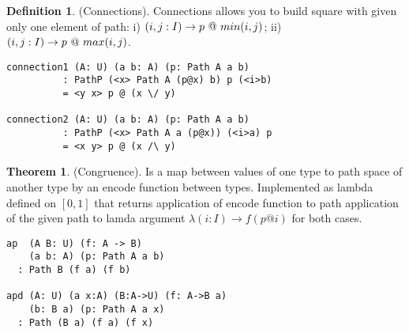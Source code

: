 \documentclass{article}
\theoremstyle{definition}
\newtheorem{definition}{Definition}
\newtheorem{theorem}{Theorem}
\begin{document}
\begin{definition} (Connections).
Connections allows you to build square
with given only one element of path: i) $\\(i,j:I) \rightarrow p\ @\ min(i,j)$;
ii) $\\(i,j:I)\rightarrow p\ @\ max(i,j)$.
\begin{center}
\end{center}
\begin{lstlisting}
connection1 (A: U) (a b: A) (p: Path A a b)
          : PathP (<x> Path A (p@x) b) p (<i>b)
          = <y x> p @ (x \/ y)

connection2 (A: U) (a b: A) (p: Path A a b)
          : PathP (<x> Path A a (p@x)) (<i>a) p
          = <x y> p @ (x /\ y)
\end{lstlisting}
\end{definition}

\begin{theorem} (Congruence).
Is a map between values of one type
to path space of another type by an encode function between types.
Implemented as lambda defined on $[0,1]$ that returns
application of encode function to path application of
the given path to lamda argument $\lambda(i:I)\rightarrow f (p @ i)$
for both cases.
\begin{lstlisting}
ap  (A B: U) (f: A -> B)
    (a b: A) (p: Path A a b)
  : Path B (f a) (f b)

apd (A: U) (a x:A) (B:A->U) (f: A->B a)
    (b: B a) (p: Path A a x)
  : Path (B a) (f a) (f x)
\end{lstlisting}
\end{theorem}
\end{document}
